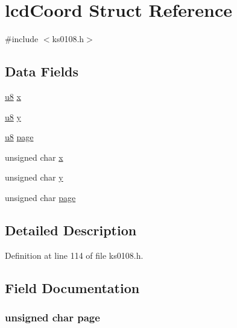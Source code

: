 \hypertarget{structlcd_coord}{\section{lcd\-Coord Struct Reference}
\label{structlcd_coord}
}


{\ttfamily \#include $<$ks0108.\-h$>$}

\subsection*{Data Fields}
\begin{DoxyCompactItemize}
\item 
\hyperlink{p8_2pinguino_2core_2typedef_8h_aed742c436da53c1080638ce6ef7d13de}{u8} \hyperlink{structlcd_coord_a66ab7498cbcfba822aa9a2891beffae2}{x}
\item 
\hyperlink{p8_2pinguino_2core_2typedef_8h_aed742c436da53c1080638ce6ef7d13de}{u8} \hyperlink{structlcd_coord_ad87f9078b74ef74a58041131d06283c2}{y}
\item 
\hyperlink{p8_2pinguino_2core_2typedef_8h_aed742c436da53c1080638ce6ef7d13de}{u8} \hyperlink{structlcd_coord_aadf5933189a2ff92dae7ee979000ff43}{page}
\item 
unsigned char \hyperlink{structlcd_coord_ac1d1eed6a8bbca26af335b9682a6475e}{x}
\item 
unsigned char \hyperlink{structlcd_coord_ac553850cf16d4c4f5812f7411e2b2b5a}{y}
\item 
unsigned char \hyperlink{structlcd_coord_a17a17908516fbcb32566244a77d57772}{page}
\end{DoxyCompactItemize}


\subsection{Detailed Description}


Definition at line 114 of file ks0108.\-h.



\subsection{Field Documentation}
\hypertarget{structlcd_coord_a17a17908516fbcb32566244a77d57772}{
\subsubsection[{page}]{\setlength{\rightskip}{0pt plus 5cm}unsigned char page}}\label{structlcd_coord_a17a17908516fbcb32566244a77d57772}


